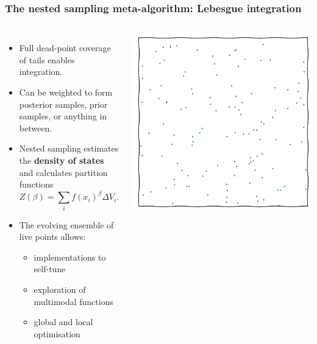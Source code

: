 \documentclass[aspectratio=169]{beamer}
\begin{document}
\begin{frame}
    \frametitle{The nested sampling meta-algorithm: Lebesgue integration}
    \begin{columns}
        \begin{itemize}
            \item Full dead-point coverage of tails enables integration.
            \item Can be weighted to form posterior samples, prior samples, or anything in between.
            \item Nested sampling estimates the \textbf{density of states} and calculates partition functions
                \[Z(\beta) = \sum_i f(x_i)^\beta \Delta V_i.\]
            \item The evolving ensemble of live points allows:
                \begin{itemize}
                    \item implementations to self-tune
                    \item exploration of multimodal functions
                    \item global and local optimisation
                \end{itemize}
        \end{itemize}
        \includegraphics[width=\textwidth,page=14]{figures/himmelblau}%

\end{columns}
\end{frame}
\end{document}
